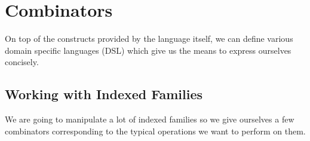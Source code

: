 \section{Combinators}

On top of the constructs provided by the language itself, we can define various
domain specific languages (DSL) which give us the means to express ourselves
concisely.

\subsection{Working with Indexed Families}
\label{indexed-combinators}

We are going to manipulate a lot of indexed families so we give ourselves a few
combinators corresponding to the typical operations we want to perform on them.

